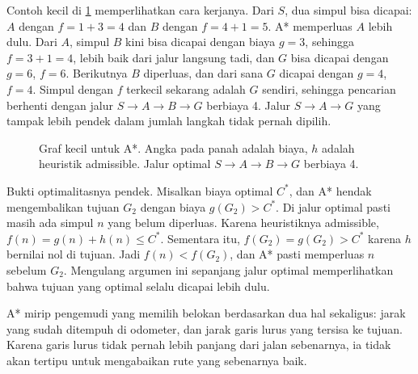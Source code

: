 Contoh kecil di \cref{fig:astar} memperlihatkan cara kerjanya. Dari $S$, dua simpul bisa dicapai: $A$ dengan
$f=1+3=4$ dan $B$ dengan $f=4+1=5$. A* memperluas $A$ lebih dulu. Dari $A$, simpul $B$ kini bisa dicapai dengan biaya
$g=3$, sehingga $f=3+1=4$, lebih baik dari jalur langsung tadi, dan $G$ bisa dicapai dengan $g=6$, $f=6$. Berikutnya
$B$ diperluas, dan dari sana $G$ dicapai dengan $g=4$, $f=4$. Simpul dengan $f$ terkecil sekarang adalah $G$ sendiri,
sehingga pencarian berhenti dengan jalur $S\to A\to B\to G$ berbiaya 4. Jalur $S\to A\to G$ yang tampak lebih pendek
dalam jumlah langkah tidak pernah dipilih.

\begin{figure}[ht]
\centering
{}
\caption{Graf kecil untuk A*. Angka pada panah adalah biaya, $h$ adalah heuristik admissible. Jalur optimal
$S\to A\to B\to G$ berbiaya 4.}
\label{fig:astar}
\end{figure}

Bukti optimalitasnya pendek. Misalkan biaya optimal $C^*$, dan A* hendak mengembalikan tujuan $G_2$ dengan biaya
$g(G_2)>C^*$. Di jalur optimal pasti masih ada simpul $n$ yang belum diperluas. Karena heuristiknya admissible,
$f(n)=g(n)+h(n)\le C^*$. Sementara itu, $f(G_2)=g(G_2)>C^*$ karena $h$ bernilai nol di tujuan. Jadi $f(n)<f(G_2)$, dan
A* pasti memperluas $n$ sebelum $G_2$. Mengulang argumen ini sepanjang jalur optimal memperlihatkan bahwa tujuan yang
optimal selalu dicapai lebih dulu.

A* mirip pengemudi yang memilih belokan berdasarkan dua hal sekaligus: jarak yang sudah ditempuh
di odometer, dan jarak garis lurus yang tersisa ke tujuan. Karena garis lurus tidak pernah lebih
panjang dari jalan sebenarnya, ia tidak akan tertipu untuk mengabaikan rute yang sebenarnya baik.

